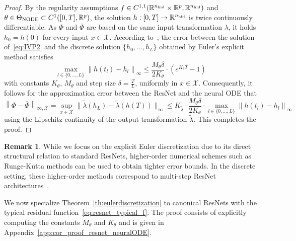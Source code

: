 \documentclass[10pt]{article}
\theoremstyle{definition}
\newtheorem{remark}[theorem]{Remark}
\numberwithin{equation}{section}
\newcommand\norm[1]{\left\lVert#1\right\rVert}
\newcommand\normm[1]{\big\lVert#1\big\lVert}
\newcommand{\R}{\mathbb{R}}
\newcommand*{\nhid}{n_\textup{hid}}
\begin{document}
\begin{proof}
	By the regularity assumptions $f\in C^{1,1}(\R^{\nhid} \times \R^p,\R^{\nhid})$ and $\theta \in \Theta_{\textup{NODE}}\subset C^1([0,T],\R^p)$, the solution $h: [0,T] \rightarrow \R^{\nhid}$ is twice continuously differentiable. As $\Phi$ and $\overline{\Phi}$ are based on the same input transformation $\lambda$, it holds $h_0 = h(0)$ for every input $x\in \mathcal{X}$. According to~\cite[Theorem 6.3]{Atkinson1989}, the error between the solution of~\eqref{eq:IVP2} and the discrete solution $\{h_0,\ldots,h_L\}$ obtained by Euler's explicit method satisfies 
	\begin{equation*}
		\max_{l \in \{0, \ldots, L\}} \norm{h(t_l) - h_l}_\infty \leq \frac{M_\theta \delta }{2K_\theta}\cdot \left(e^{K_\theta T}-1\right)
	\end{equation*}
	with constants $K_\theta$, $M_\theta$ and step size $\delta =\frac{T}{L}$, uniformly in $x \in \mathcal{X}$. Consequently, it follows for the approximation error between the ResNet and the neural ODE that 
	\begin{equation*}
		\norm{\Phi-\overline{\Phi}}_{\infty,\mathcal{X}}  =   \sup_{x \in \mathcal{X}} \normm{\tilde{\lambda}(h_L) - \tilde{\lambda}(h(T))}_\infty \leq K_{\tilde{\lambda}} \cdot \frac{M_\theta \delta }{2K_\theta}\cdot \max_{l \in \{0, \ldots, L\}} \norm{h(t_l) - h_l}_\infty 
	\end{equation*}
	using the Lipschitz continuity of the output transformation $\tilde{\lambda}$. This completes the proof.
\end{proof}

\begin{remark}\label{rem:discretizations}
    While we focus on the explicit Euler discretization due to its direct structural relation to standard ResNets, higher-order numerical schemes such as Runge-Kutta methods can be used to obtain tighter error bounds. In the discrete setting, these higher-order methods correspond to multi-step ResNet architectures~\cite{haber2017,Lu2018}.
\end{remark}

We now specialize Theorem~\ref{th:eulerdiscretization} to canonical ResNets with the typical residual function~\eqref{eq:resnet_typical_f}. The proof consists of explicitly computing the constants $M_\theta$ and $K_\theta$ and is given in Appendix~\ref{app:cor_proof_resnet_neuralODE}.
\end{document}
